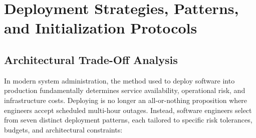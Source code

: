 \documentclass[11pt,a4paper]{article}
\begin{document}
\section{Deployment Strategies, Patterns, and Initialization Protocols}
\label{sec:deployment_strategies}

\subsection{Architectural Trade-Off Analysis}
In modern system administration, the method used to deploy software into production fundamentally determines service availability, operational risk, and infrastructure costs. Deploying is no longer an all-or-nothing proposition where engineers accept scheduled multi-hour outages. Instead, software engineers select from seven distinct deployment patterns, each tailored to specific risk tolerances, budgets, and architectural constraints:
\end{document}
